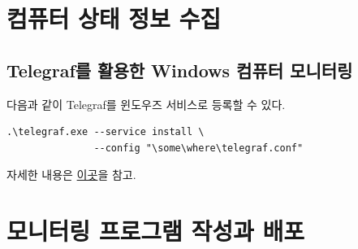 \documentclass[onecolumn,showpacs,preprintnumbers,amsmath,amssymb,superscriptaddress,preprint]{revtex4-1}
\newenvironment{cfigure1c}[1][tbp]{\begin{figure}[#1]\centering}{\end{figure}}
\begin{document}
\section{컴퓨터 상태 정보 수집}

\subsection{Telegraf를 활용한 Windows 컴퓨터 모니터링}


다음과 같이 Telegraf를 윈도우즈 서비스로 등록할 수 있다.

\begin{verbatim}
.\telegraf.exe --service install \
               --config "\some\where\telegraf.conf"
\end{verbatim}

자세한 내용은 \href{https://www.influxdata.com/blog/using-telegraf-on-windows/}{이곳}을 참고.

\section{모니터링 프로그램 작성과 배포}




%
\end{document}
